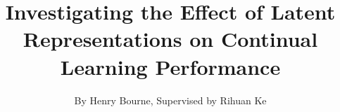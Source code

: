 \documentclass[a4paper]{article}
\title{Investigating the Effect of Latent Representations on Continual Learning Performance}
\author{By Henry Bourne, Supervised by Rihuan Ke}
\date{}
\begin{document}
\maketitle


\begin{abstract}
\end{abstract}







% 

\small


\end{document}
